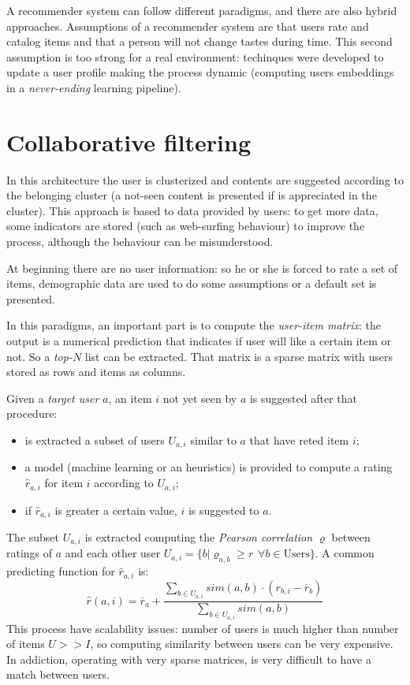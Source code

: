 \documentclass[11pt, a4page]{article}
\begin{document}
A recommender system can follow different paradigms, and there are also hybrid approaches.
Assumptions of a recommender system are that users rate and catalog items and that a person will not change tastes during time.
This second assumption is too strong for a real environment: techinques were developed to update a user profile making the process dynamic (computing users embeddings in a \textit{never-ending} learning pipeline).


\section{Collaborative filtering}
In this architecture the user is clusterized and contents are suggested according to the belonging cluster (a not-seen content is presented if is appreciated in the cluster).
This approach is based to data provided by users: to get more data, some indicators are stored (such as web-surfing behaviour) to improve the process, although the behaviour can be misunderstood.

At beginning there are no user information: so he or she is forced to rate a set of items, demographic data are used to do some assumptions or a default set is presented.

In this paradigms, an important part is to compute the \textit{user-item matrix}: the output is a numerical prediction that indicates if user will like a certain item or not.
So a \textit{top-}$N$ list can be extracted.
That matrix is a sparse matrix with users stored as rows and items as columns.

Given a \textit{target user} $a$, an item $i$ not yet seen by $a$ is suggested after that procedure:
\begin{itemize}[noitemsep]
\item is extracted a subset of users $U_{a, i}$ similar to $a$ that have reted item $i$;
\item a model (machine learning or an heuristics) is provided to compute a rating $\hat{r}_{a, i}$ for item $i$ according to $U_{a, i}$;
\item if $\hat{r}_{a, i}$ is greater a certain value, $i$ is suggested to $a$.
\end{itemize}

The subset $U_{a, i}$ is extracted computing the \textit{Pearson correlation} $\varrho$ between ratings of $a$ and each other user $U_{a, i} = \{ b | \varrho_{a, b} \geq r \hspace{5pt} \forall b \in \text{Users} \}$.
A common predicting function for $\hat{r}_{a, i}$ is:
\begin{equation*}
  \hat{r}(a, i) = \overline{r}_a + \frac{\sum_{b \in U_{a, i}} sim(a, b) \cdot (r_{b, i} - \overline{r}_b)}{\sum_{b \in U_{a, i}} sim(a, b)}
\end{equation*}
This process have scalability issues: number of users is much higher than number of items $U >> I$, so computing similarity between users can be very expensive.
In addiction, operating with very sparse matrices, is very difficult to have a match between users.
\end{document}
